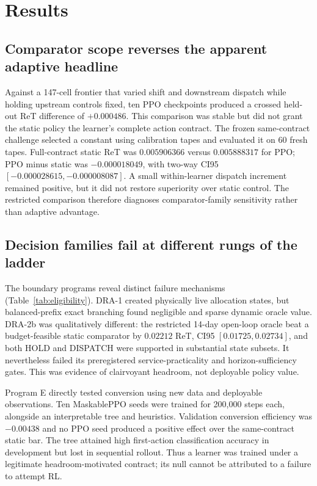 \section{Results}\label{sec:results}

\subsection{Comparator scope reverses the apparent adaptive headline}

Against a 147-cell frontier that varied shift and downstream dispatch while holding upstream
controls fixed, ten PPO checkpoints produced a crossed held-out ReT difference of $+0.000486$.
This comparison was stable but did not grant the static policy the learner's complete action
contract. The frozen same-contract challenge selected a constant using calibration tapes and
evaluated it on 60 fresh tapes. Full-contract static ReT was $0.005906366$ versus $0.005888317$
for PPO; PPO minus static was $-0.000018049$, with two-way CI95
$[-0.000028615,-0.000008087]$. A small within-learner dispatch increment remained positive,
but it did not restore superiority over static control. The restricted comparison therefore
diagnoses comparator-family sensitivity rather than adaptive advantage.

\subsection{Decision families fail at different rungs of the ladder}

The boundary programs reveal distinct failure mechanisms (Table~\ref{tab:eligibility}).
DRA-1 created physically live allocation states, but balanced-prefix exact branching found
negligible and sparse dynamic oracle value. DRA-2b was qualitatively different: the restricted
14-day open-loop oracle beat a budget-feasible static comparator by $0.02212$ ReT, CI95
$[0.01725,0.02734]$, and both HOLD and DISPATCH were supported in substantial state subsets.
It nevertheless failed its preregistered service-practicality and horizon-sufficiency gates.
This was evidence of clairvoyant headroom, not deployable policy value.

Program E directly tested conversion using new data and deployable observations. Ten
MaskablePPO seeds were trained for 200,000 steps each, alongside an interpretable tree and
heuristics. Validation conversion efficiency was $-0.00438$ and no PPO seed produced a
positive effect over the same-contract static bar. The tree attained high first-action
classification accuracy in development but lost in sequential rollout. Thus a learner was
trained under a legitimate headroom-motivated contract; its null cannot be attributed to a
failure to attempt RL.

